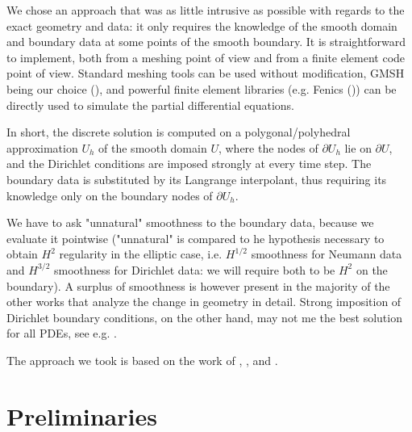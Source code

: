 \documentclass[english,a4paper,9pt,oneside]{scrbook}	%
\theoremstyle{break}
\theoremstyle{remark}
\begin{document}
\begin{appendices}
We chose an approach that was as little intrusive as possible with regards to the exact geometry and data: it only requires the knowledge of the smooth domain and boundary data at some points of the smooth boundary. It is straightforward to implement, both from a meshing point of view and from a finite element code point of view. Standard meshing tools can be used without modification, GMSH being our choice (\cite{gmsh}), and powerful finite element libraries (e.g. Fenics (\cite{fenics})) can be directly used to simulate the partial differential equations.

In short, the discrete solution is computed on a polygonal/polyhedral approximation $U_h$ of the smooth domain $U$, where the nodes of $\partial U_h$ lie on $\partial U$, and the Dirichlet conditions are imposed strongly at every time step. The boundary data is substituted by its Langrange interpolant, thus requiring its knowledge only on the boundary nodes of $\partial U_h$.

We have to ask "unnatural" smoothness to the boundary data, because we evaluate it pointwise ("unnatural" is compared to he hypothesis necessary to obtain $H^2$ regularity in the elliptic case, i.e. $H^{1/2}$ smoothness for Neumann data and $H^{3/2}$ smoothness for Dirichlet data: we will require both to be $H^2$ on the boundary). A surplus of smoothness is however present in the majority of the other works that analyze the change in geometry in detail. Strong imposition of Dirichlet boundary conditions, on the other hand, may not me the best solution for all PDEs, see e.g. \cite{hughes}.

The approach we took is based on the work of \cite{elliott}, \cite{ranner}, \cite{bernardi} and \cite{edelmann}.



\section{Preliminaries}


\end{appendices}
\end{document}
